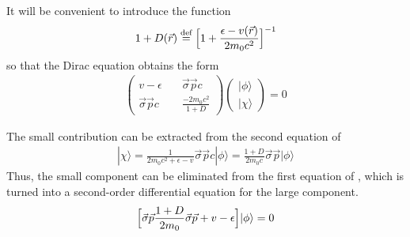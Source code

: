 \documentclass[11pt,a4paper]{report}
\begin{document}
It will be convenient to introduce the function
\begin{eqnarray}
1+D(\vec{r})\stackrel{\text{def}}{=}\Bigl[1+\frac{\epsilon-v(\vec{r})}{2m_0c^2}\Bigr]^{-1}
\label{eq:defrelativisticfactor}
\end{eqnarray}
so that the Dirac equation obtains the form
\begin{eqnarray}
\left(\begin{array}{cc}
v-\epsilon &\quad \vec{\sigma}\vec{p}c\\
\vec{\sigma}\vec{p}c &\quad \frac{-2m_0c^2}{1+D}\end{array}\right)
\left(\begin{array}{c}|\phi\rangle\\|\chi\rangle\end{array}\right)=0
\label{eq:dirac2by2withepsilonb}
\end{eqnarray}

The small contribution can be extracted from the second equation of
\begin{eqnarray}
|\chi\rangle
=\frac{1}{2m_0c^2+\epsilon-v}
\vec{\sigma}\vec{p}c |\phi\rangle
=\frac{1+D}{2m_0c}
\vec{\sigma}\vec{p} |\phi\rangle
\label{eq:defsmallcomponent}
\end{eqnarray}
Thus, the small component can be eliminated from the first equation of
, which is turned into a second-order
differential equation for the large component.
\begin{eqnarray}
\Bigl[\vec{\sigma}\vec{p} \frac{1+D}{2m_0}
\vec{\sigma}\vec{p} +v-\epsilon\Bigr]|\phi\rangle=0
\label{eq:diraclargebeforemagic}
\end{eqnarray}
\end{document}
